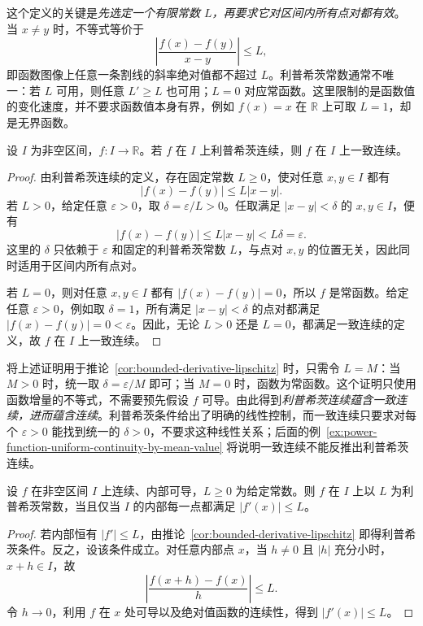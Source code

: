 这个定义的关键是\emph{先选定一个有限常数 $L$，再要求它对区间内所有点对都有效}。当 $x\neq y$ 时，不等式等价于
\[
    \left|\frac{f(x)-f(y)}{x-y}\right|\leq L,
\]
即函数图像上任意一条割线的斜率绝对值都不超过 $L$。利普希茨常数通常不唯一：若 $L$ 可用，则任意 $L'\geq L$ 也可用；$L=0$ 对应常函数。这里限制的是函数值的变化速度，并不要求函数值本身有界，例如 $f(x)=x$ 在 $\mathbb{R}$ 上可取 $L=1$，却是无界函数。

\begin{proposition}[利普希茨连续蕴含一致连续]
\label{prop:lipschitz-implies-uniform-continuity}
设 $I$ 为非空区间，$f:I\to\mathbb{R}$。若 $f$ 在 $I$ 上利普希茨连续，则 $f$ 在 $I$ 上一致连续。
\end{proposition}

\begin{proof}
由利普希茨连续的定义，存在固定常数 $L\geq0$，使对任意 $x,y\in I$ 都有
\[
    |f(x)-f(y)|\leq L|x-y|.
\]
若 $L>0$，给定任意 $\varepsilon>0$，取 $\delta=\varepsilon/L>0$。任取满足 $|x-y|<\delta$ 的 $x,y\in I$，便有
\[
    |f(x)-f(y)|\leq L|x-y|<L\delta=\varepsilon.
\]
这里的 $\delta$ 只依赖于 $\varepsilon$ 和固定的利普希茨常数 $L$，与点对 $x,y$ 的位置无关，因此同时适用于区间内所有点对。

若 $L=0$，则对任意 $x,y\in I$ 都有 $|f(x)-f(y)|=0$，所以 $f$ 是常函数。给定任意 $\varepsilon>0$，例如取 $\delta=1$，所有满足 $|x-y|<\delta$ 的点对都满足 $|f(x)-f(y)|=0<\varepsilon$。因此，无论 $L>0$ 还是 $L=0$，都满足一致连续的定义，故 $f$ 在 $I$ 上一致连续。
\end{proof}

将上述证明用于推论~\ref{cor:bounded-derivative-lipschitz} 时，只需令 $L=M$：当 $M>0$ 时，统一取 $\delta=\varepsilon/M$ 即可；当 $M=0$ 时，函数为常函数。这个证明只使用函数增量的不等式，不需要预先假设 $f$ 可导。由此得到\emph{利普希茨连续蕴含一致连续，进而蕴含连续}。利普希茨条件给出了明确的线性控制，而一致连续只要求对每个 $\varepsilon>0$ 能找到统一的 $\delta>0$，不要求这种线性关系；后面的例~\ref{ex:power-function-uniform-continuity-by-mean-value} 将说明一致连续不能反推出利普希茨连续。

\begin{proposition}
\label{prop:lipschitz-derivative-criterion}
设 $f$ 在非空区间 $I$ 上连续、内部可导，$L\geq0$ 为给定常数。则 $f$ 在 $I$ 上以 $L$ 为利普希茨常数，当且仅当 $I$ 的内部每一点都满足 $|f'(x)|\leq L$。
\end{proposition}

\begin{proof}
若内部恒有 $|f'|\leq L$，由推论~\ref{cor:bounded-derivative-lipschitz} 即得利普希茨条件。反之，设该条件成立。对任意内部点 $x$，当 $h\neq0$ 且 $|h|$ 充分小时，$x+h\in I$，故
\[
    \left|\frac{f(x+h)-f(x)}{h}\right|\leq L.
\]
令 $h\to0$，利用 $f$ 在 $x$ 处可导以及绝对值函数的连续性，得到 $|f'(x)|\leq L$。
\end{proof}

